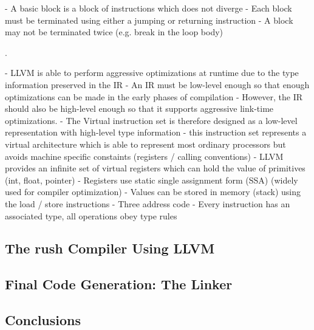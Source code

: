 - A basic block is a block of instructions which does not diverge
- Each block must be terminated using either a jumping or returning instruction
- A block may not be terminated twice (e.g. break in the loop body)

\cite[p.~211-213]{Hsu2021-ez}.

- LLVM is able to perform aggressive optimizations at runtime due to the type information preserved in the IR
- An IR must be low-level enough so that enough optimizations can be made in the early phases of compilation
- However, the IR should also be high-level enough so that it supports aggressive link-time optimizations.
- The Virtual instruction set is therefore designed as a low-level representation with high-level type information
- this instruction set represents a virtual architecture which is able to represent most ordinary processors but avoids machine specific constaints (registers / calling conventions)
- LLVM provides an infinite set of virtual registers which can hold the value of primitives (int, float, pointer)
- Registers use static single assignment form (SSA) (widely used for compiler optimization)
- Values can be stored in memory (stack) using the load / store instructions
- Three address code
- Every instruction has an associated type, all operations obey type rules

\cite[p.~14-17]{Lattner:MSThesis02}


\subsection{The rush Compiler Using LLVM}



\subsection{Final Code Generation: The Linker}


\subsection{Conclusions}

